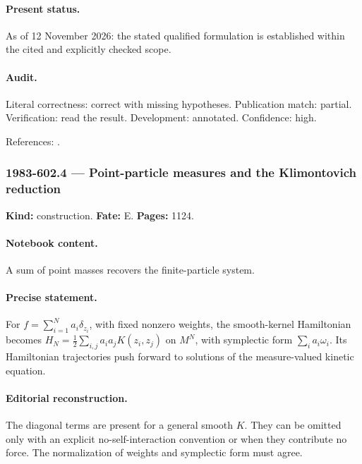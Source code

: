 \paragraph{Present status.} As of 12 November 2026: the stated qualified formulation is established within the cited and explicitly checked scope.

\paragraph{Audit.} Literal correctness: correct with missing hypotheses. Publication match: partial. Verification: read the result. Development: annotated. Confidence: high.

\noindent References: \citep{morrison1980maxwell}.\par

\subsubsection{1983-602.4 --- Point-particle measures and the Klimontovich reduction}

\label{item:1983-602.4}

\noindent\textbf{Kind:} construction. \textbf{Fate:} E. \textbf{Pages:} 1124.\par

\paragraph{Notebook content.} A sum of point masses recovers the finite-particle system.

\paragraph{Precise statement.} For \(f=\sum_{i=1}^Na_i\delta_{z_i}\), with fixed nonzero weights, the smooth-kernel Hamiltonian becomes \(H_N=\frac12\sum_{i,j}a_ia_jK(z_i,z_j)\) on \(M^N\), with symplectic form \(\sum_i a_i\omega_i\). Its Hamiltonian trajectories push forward to solutions of the measure-valued kinetic equation.

\paragraph{Editorial reconstruction.} The diagonal terms are present for a general smooth \(K\). They can be omitted only with an explicit no-self-interaction convention or when they contribute no force. The normalization of weights and symplectic form must agree.

